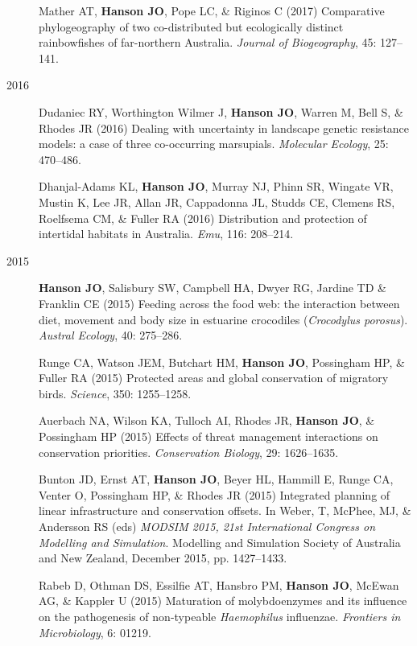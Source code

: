 \documentclass[12pt,a4paper]{article}
\begin{document}
\begin{description}
\item[] Mather AT, \textbf{Hanson JO}, Pope LC, \& Riginos C (2017) Comparative phylogeography of two co-distributed but ecologically distinct rainbowfishes of far-northern Australia. \textit{Journal of Biogeography}, 45: 127--141.

\item[2016] Dudaniec RY, Worthington Wilmer J, \textbf{Hanson JO}, Warren M, Bell S, \& Rhodes JR (2016) Dealing with uncertainty in landscape genetic resistance models: a case of three co-occurring marsupials. \textit{Molecular Ecology}, 25: 470--486.

\item[] Dhanjal-Adams KL, \textbf{Hanson JO}, Murray NJ, Phinn SR, Wingate VR, Mustin K, Lee JR, Allan JR, Cappadonna JL, Studds CE, Clemens RS, Roelfsema CM, \& Fuller RA (2016) Distribution and protection of intertidal habitats in Australia. \textit{Emu}, 116: 208--214.

\item[2015] \textbf{Hanson JO}, Salisbury SW, Campbell HA, Dwyer RG, Jardine TD \& Franklin CE (2015) Feeding across the food web: the interaction between diet, movement and body size in estuarine crocodiles (\textit{Crocodylus porosus}). \textit{Austral Ecology}, 40: 275--286.

\item[] Runge CA, Watson JEM, Butchart HM, \textbf{Hanson JO}, Possingham HP, \& Fuller RA (2015) Protected areas and global conservation of migratory birds. \textit{Science}, 350: 1255--1258.

Auerbach NA, Wilson KA, Tulloch AI, Rhodes JR, \textbf{Hanson JO}, \& Possingham HP (2015) Effects of threat management interactions on conservation priorities. \textit{Conservation Biology}, 29: 1626--1635.

\item[] Bunton JD, Ernst AT, \textbf{Hanson JO}, Beyer HL, Hammill E, Runge CA, Venter O, Possingham HP, \& Rhodes JR (2015) Integrated planning of linear infrastructure and conservation offsets. In Weber, T, McPhee, MJ, \& Andersson RS (eds) \textit{MODSIM 2015, 21st International Congress on Modelling and Simulation}. Modelling and Simulation Society of Australia and New Zealand, December 2015, pp. 1427--1433.

\item[] Rabeb D, Othman DS, Essilfie AT, Hansbro PM, \textbf{Hanson JO}, McEwan AG, \& Kappler U (2015) Maturation of molybdoenzymes and its influence on the pathogenesis of non-typeable \textit{Haemophilus} influenzae. \textit{Frontiers in Microbiology}, 6: 01219.

\end{description}
\end{document}

